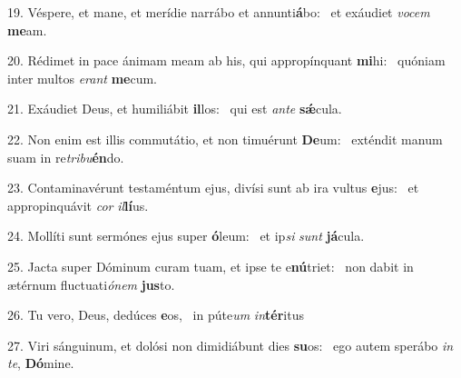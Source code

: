 19. Véspere, et mane, et merídie narrábo et annunti\textbf{á}bo: \ast\  et exáudiet \textit{vo}\textit{cem} \textbf{me}am.\

20. Rédimet in pace ánimam meam ab his, qui appropínquant \textbf{mi}hi: \ast\  quóniam inter multos \textit{e}\textit{rant} \textbf{me}cum.\

21. Exáudiet Deus, et humiliábit \textbf{il}los: \ast\  qui est \textit{an}\textit{te} \textbf{sǽ}cula.\

22. Non enim est illis commutátio, et non timuérunt \textbf{De}um: \ast\  exténdit manum suam in re\textit{tri}\textit{bu}\textbf{én}do.\

23. Contaminavérunt testaméntum ejus, divísi sunt ab ira vultus \textbf{e}jus: \ast\  et appropinquávit \textit{cor} \textit{il}\textbf{lí}us.\

24. Mollíti sunt sermónes ejus super \textbf{ó}leum: \ast\  et ip\textit{si} \textit{sunt} \textbf{já}cula.\

25. Jacta super Dóminum curam tuam, et ipse te e\textbf{nú}triet: \ast\  non dabit in ætérnum fluctuati\textit{ó}\textit{nem} \textbf{jus}to.\

26. Tu vero, Deus, dedúces \textbf{e}os, \ast\  in púte\textit{um} \textit{in}\textbf{tér}itus\

27. Viri sánguinum, et dolósi non dimidiábunt dies \textbf{su}os: \ast\  ego autem sperábo \textit{in} \textit{te}, \textbf{Dó}mine.\

